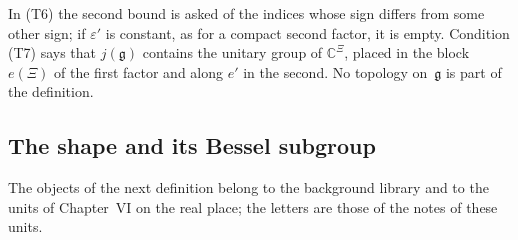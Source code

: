 \documentclass[11pt,a4paper]{article}
\theoremstyle{plainx}
\theoremstyle{uprightx}
\newcommand{\CC}{\mathbb{C}}
\begin{document}
In (T6) the second bound is asked of the indices whose sign differs from some other sign; if $\varepsilon'$ is
constant, as for a compact second factor, it is empty. Condition (T7) says that $j(\mathfrak{g})$ contains the unitary group of
$\CC^{\Xi}$, placed in the block $e(\Xi)$ of the first factor and along $e'$ in the second. No topology on~$\mathfrak{g}$ is
part of the definition.

\subsection*{\normalsize The shape and its Bessel subgroup}\label{s:shape}
The objects of the next definition belong to the background library and to the units of Chapter~VI on the real
place; the letters are those of the notes of these units.
\end{document}
